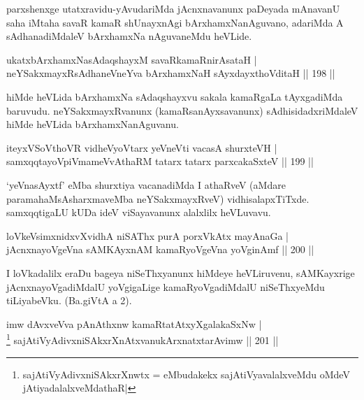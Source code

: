 \begin{artha}
parxshenxge utatxravidu-yAvudariMda jAcnxnavanunx paDeyada mAnavanU saha iMtaha savaR kamaR shUnayxnAgi bArxhamxNanAguvano, adariMda A sAdhanadiMdaleV bArxhamxNa nAguvaneMdu heVLide.
\end{artha}

\begin{shl}
ukatxbArxhamxNasAdaqshayxM savaRkamaRnirAsataH |\\
neYSakxmayxRsAdhaneVneYva bArxhamxNaH sAyxdayxthoVditaH \hfill || 198 ||
\end{shl}

\begin{artha}
hiMde heVLida bArxhamxNa sAdaqshayxvu sakala kamaRgaLa tAyxgadiMda baruvudu. neYSakxmayxRvanunx (kamaRsanAyxsavanunx) sAdhisidadxriMdaleV hiMde heVLida bArxhamxNanAguvanu.
\end{artha}

\begin{shl}
iteyxVSoV\s thoVR vidheVyoV\s tarx yeVneVti vacasA shurxteVH |\\
samxqqtayoV\s piVmameVvAthaRM tatarx tatarx parxcakaSxteV \hfill || 199 ||
\end{shl}

\begin{artha}
`yeVnasAyxtf' eMba shurxtiya vacanadiMda I athaRveV (aMdare paramahaMsAsharxmaveMba neYSakxmayxRveV) vidhisalapxTiTxde. samxqqtigaLU kUDa ideV viSayavanunx alalxlilx heVLuvavu.
\end{artha}%


\begin{shl}
loVkeV\s simxnidxvXvidhA niSAThx purA porxVkAtx mayA\s naGa |\\
jAcnxnayoVgeVna sAMKAyxnAM kamaRyoVgeVna yoVginAmf \hfill || 200 ||
\end{shl}

\begin{artha}
I loVkadalilx eraDu bageya niSeThxyanunx hiMdeye heVLiruvenu, sAMKayxrige jAcnxnayoVgadiMdalU yoVgigaLige kamaRyoVgadiMdalU niSeThxyeMdu tiLiyabeVku. (Ba.giVtA a 2).
\end{artha}



\begin{shl}
imw dAvxveVva pAnAthxnw kamaRtatAtxyXgalakaSxNw |\\
\footnote{sajAtiVyAdivxniSAkxrXnwtx = eMbudakekx sajAtiVyavalalxveMdu oMdeV jAtiyadalalxveMdathaR|} sajAtiVyAdivxniSAkxrXnAtxvanukArxnatxtarAvimw \hfill || 201 ||
\end{shl}

